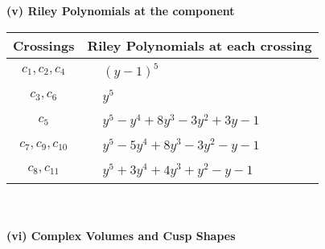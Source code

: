 \documentclass[1p]{elsarticle_modified}
\theoremstyle{definition}
\begin{document}
\newpage\renewcommand{\arraystretch}{1}
\flushleft \textbf{(v) Riley Polynomials at the component}\newline \\
\begin{tabular}{m{50pt}|m{274pt}}
Crossings & \hspace{64pt}Riley Polynomials at each crossing \\
\hline $$\begin{aligned}c_{1},c_{2},c_{4}\end{aligned}$$&$\begin{aligned}
&(y-1)^5
\end{aligned}$\\
\hline $$\begin{aligned}c_{3},c_{6}\end{aligned}$$&$\begin{aligned}
&y^5
\end{aligned}$\\
\hline $$\begin{aligned}c_{5}\end{aligned}$$&$\begin{aligned}
&y^5- y^4+8 y^3-3 y^2+3 y-1
\end{aligned}$\\
\hline $$\begin{aligned}c_{7},c_{9},c_{10}\end{aligned}$$&$\begin{aligned}
&y^5-5 y^4+8 y^3-3 y^2- y-1
\end{aligned}$\\
\hline $$\begin{aligned}c_{8},c_{11}\end{aligned}$$&$\begin{aligned}
&y^5+3 y^4+4 y^3+y^2- y-1
\end{aligned}$\\
\hline
\end{tabular}\\~\\
\newpage\flushleft \textbf{(vi) Complex Volumes and Cusp Shapes}
\end{document}
